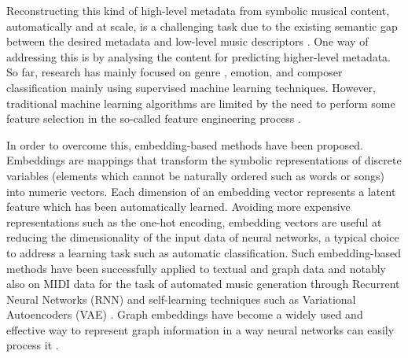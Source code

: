 \documentclass{article}
\begin{document}

Reconstructing this kind of high-level metadata from symbolic musical content, automatically and at scale, is a challenging task due to the existing semantic gap between the desired metadata and low-level music descriptors \citep{celma2008foafing}. One way of addressing this is by analysing the content for predicting higher-level metadata. So far, research has mainly focused on genre \citep{McKay2004,Cataltepe2007}, emotion, and composer \citep{fu2011survey} classification mainly using supervised machine learning techniques. However, traditional machine learning algorithms are limited by the need to perform some feature selection in the so-called feature engineering process \citep{guyon2003introduction}. 


In order to overcome this, embedding-based methods have been proposed. Embeddings are mappings that transform the symbolic representations of discrete variables (elements which cannot be naturally ordered such as words or songs) into numeric vectors. Each dimension of an embedding vector represents a latent feature which has been automatically learned. Avoiding more expensive representations such as the one-hot encoding, embedding vectors are useful at reducing the dimensionality of the input data of neural networks, a typical choice to address a learning task such as automatic classification. 
Such embedding-based methods have been successfully applied to textual \citep{mikolov2013efficient} and graph data \citep{grover2016node2vec} and notably also on MIDI data for the task of automated music generation through Recurrent Neural Networks (RNN) \citep{huang2016deepmusic,yan2018part} and self-learning techniques such as Variational Autoencoders (VAE) \citep{roberts2018}. Graph embeddings have become a widely used and effective way to represent graph information in a way neural networks can easily process it \citep{ristoski2018rdf2vec}.
\end{document}
